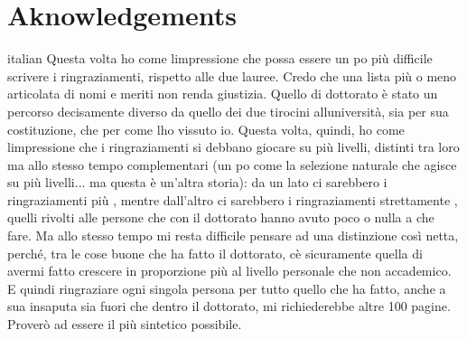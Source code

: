 
% 

{
\chapter*{Aknowledgements}
\label{aknowledgements}
}

\begin{otherlanguage*}{italian}
Questa volta ho come l\curlyapostrophe{}impressione che possa essere un po\curlyapostrophe{} più difficile scrivere i ringraziamenti, rispetto alle due lauree. Credo che una lista più o meno articolata di nomi e meriti non renda giustizia. Quello di dottorato è stato un percorso decisamente diverso da quello dei due tirocini all\curlyapostrophe{}università, sia per sua costituzione, che per come l\curlyapostrophe{}ho vissuto io. Questa volta, quindi, ho come l\curlyapostrophe{}impressione che i ringraziamenti si debbano giocare su più livelli, distinti tra loro ma allo stesso tempo complementari (un po\curlyapostrophe{} come la selezione naturale che agisce su più livelli... ma questa è un'altra storia): da un lato ci sarebbero i ringraziamenti più , mentre dall'altro ci sarebbero i ringraziamenti strettamente , quelli rivolti alle persone che con il dottorato hanno avuto poco o nulla a che fare. Ma allo stesso tempo mi resta difficile pensare ad una distinzione così netta, perché, tra le cose buone che ha fatto il dottorato, c\curlyapostrophe{}è sicuramente quella di avermi fatto crescere in proporzione più al livello personale che non accademico. E quindi ringraziare ogni singola persona per tutto quello che ha fatto, anche a sua insaputa sia fuori che dentro il dottorato, mi richiederebbe altre 100 pagine. Proverò ad essere il più sintetico possibile.



\end{otherlanguage*}
